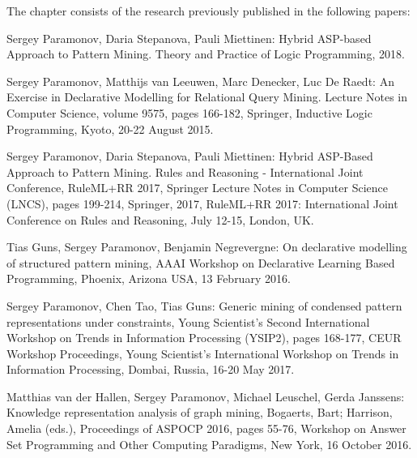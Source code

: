 The chapter consists of the research previously published in the following papers:
\begin{addmargin}[2em]{2em}
\pubrev
Sergey Paramonov, Daria Stepanova, Pauli Miettinen: Hybrid ASP-based
    Approach to Pattern Mining. Theory and Practice of Logic
    Programming, 2018.
\pubrevend

Sergey Paramonov, Matthijs van Leeuwen, Marc Denecker, Luc De Raedt:
An Exercise in Declarative Modelling for Relational Query Mining.
Lecture Notes in Computer Science, volume 9575, pages 166-182,
    Springer, Inductive Logic Programming, Kyoto, 20-22 August 2015.

Sergey Paramonov, Daria Stepanova, Pauli Miettinen:
Hybrid ASP-Based Approach to Pattern Mining.  
Rules and Reasoning - International Joint Conference, RuleML+RR 2017,
    Springer Lecture Notes in Computer Science (LNCS), pages 199-214,
    Springer, 2017, RuleML+RR 2017: International Joint Conference on
    Rules and Reasoning, July 12-15, London, UK.

Tias Guns, Sergey Paramonov, Benjamin Negrevergne: On declarative
    modelling of structured pattern mining, AAAI Workshop on
    Declarative Learning Based Programming, Phoenix, Arizona USA, 13
    February 2016.

Sergey Paramonov, Chen Tao, Tias Guns: Generic mining of condensed
    pattern representations under constraints, Young Scientist's
    Second International Workshop on Trends in Information Processing
    (YSIP2), pages 168-177, CEUR Workshop Proceedings, Young
    Scientist's International Workshop on Trends in Information
    Processing, Dombai, Russia, 16-20 May 2017.

Matthias van der Hallen, Sergey Paramonov, Michael Leuschel, Gerda
    Janssens: Knowledge representation analysis of graph mining,
    Bogaerts, Bart; Harrison, Amelia (eds.), Proceedings of ASPOCP
    2016, pages 55-76, Workshop on Answer Set Programming and Other
    Computing Paradigms, New York, 16 October 2016.
\end{addmargin}





